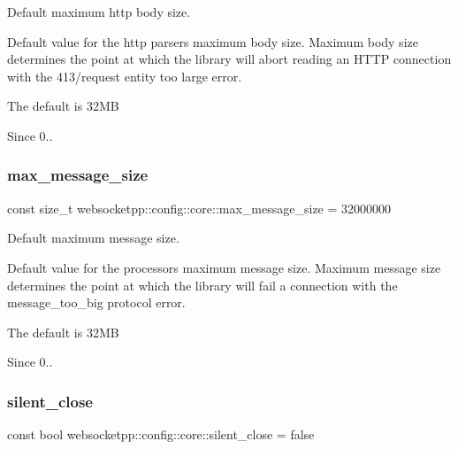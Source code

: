 Default maximum http body size. 

Default value for the http parser\textquotesingle{}s maximum body size. Maximum body size determines the point at which the library will abort reading an H\+T\+TP connection with the 413/request entity too large error.

The default is 32\+MB

\begin{DoxySince}{Since}
0.. 
\end{DoxySince}
\mbox{\label{structwebsocketpp_1_1config_1_1core_a54875ed41a1d11149c684f9467b2e0d5}} 
\subsubsection{\texorpdfstring{max\+\_\+message\+\_\+size}{max\_message\_size}}
{\footnotesize\ttfamily const size\+\_\+t websocketpp\+::config\+::core\+::max\+\_\+message\+\_\+size = 32000000\hspace{0.3cm}{\ttfamily [static]}}



Default maximum message size. 

Default value for the processor\textquotesingle{}s maximum message size. Maximum message size determines the point at which the library will fail a connection with the message\+\_\+too\+\_\+big protocol error.

The default is 32\+MB

\begin{DoxySince}{Since}
0.. 
\end{DoxySince}
\mbox{\label{structwebsocketpp_1_1config_1_1core_acb5ef1d40ae50ab2443837270d715f53}} 
\subsubsection{\texorpdfstring{silent\+\_\+close}{silent\_close}}
{\footnotesize\ttfamily const bool websocketpp\+::config\+::core\+::silent\+\_\+close = false\hspace{0.3cm}{\ttfamily [static]}}



